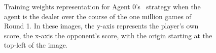 \begin{figure}
\caption{%
	Training weights representation for Agent 0's \handmaxavg\
	strategy when the agent is the dealer
	over the course of the one million games of Round 1.
	In these images, the y-axis represents the player's own score,
	the x-axis the opponent's score,
	with the origin starting at the top-left of the image.
}
\label{fig:r1-flip}
\end{figure}
